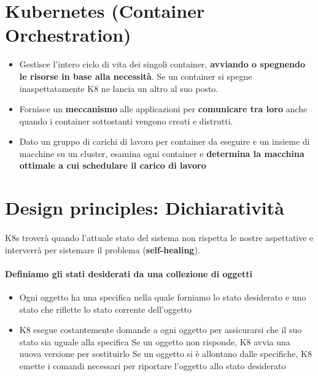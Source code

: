\documentclass[a4paper, 12pt]{report}
\begin{document}
        \section{Kubernetes (Container Orchestration)}
          \begin{itemize}
            \item Gestisce l'intero ciclo di vita dei singoli container, \textbf{avviando o spegnendo le risorse in base alla necessità}.
            Se un container si spegne inaspettatamente K8 ne lancia un altro al suo posto.
            \item Fornisce un \textbf{meccanismo} alle applicazioni per \textbf{comunicare tra loro} anche quando i container sottostanti vengono creati e distrutti.
            \item Dato un gruppo di carichi di lavoro per container da eseguire e un insieme di macchine su un cluster, esamina ogni container e \textbf{determina la macchina ottimale
                  a cui schedulare il carico di lavoro}
          \end{itemize} 
        \clearpage
          \section{Design principles: Dichiaratività}
          \paragraph{} K8s troverà quando l'attuale stato del sistema non rispetta le nostre aspettative e interverrà per sistemare il problema (\textbf{self-healing}).
          \paragraph{Definiamo gli stati desiderati da una collezione di oggetti}
          \begin{itemize}
            \item Ogni oggetto ha una specifica nella quale forniamo lo stato desiderato e uno stato che riflette lo stato corrente dell'oggetto
            \item K8 esegue costantemente domande a ogni oggetto per assicurarsi che il suo stato sia uguale alla specifica
            \subitem{$\circ$} Se un oggetto non risponde, K8 avvia una nuova versione per sostituirlo
            \subitem{$\circ$} Se un oggetto si è allontano dalle specifiche, K8 emette i comandi necessari per riportare l'oggetto allo stato desiderato
          \end{itemize}
\end{document}
